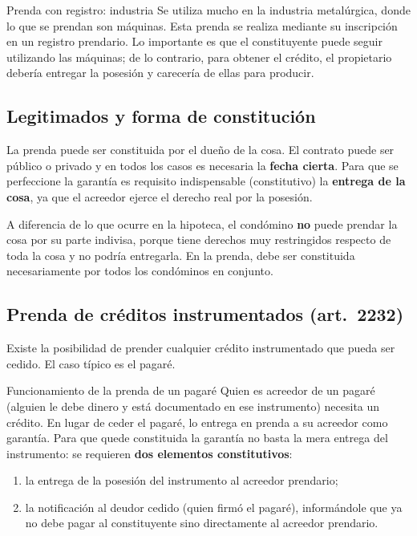 \documentclass[12pt,oneside]{book}
\begin{document}
\begin{example}{Prenda con registro: industria}
Se utiliza mucho en la industria metalúrgica, donde lo que se prendan son máquinas. Esta prenda se realiza mediante su inscripción en un registro prendario. Lo importante es que el constituyente puede seguir utilizando las máquinas; de lo contrario, para obtener el crédito, el propietario debería entregar la posesión y carecería de ellas para producir.
\end{example}

\subsection{Legitimados y forma de constitución}

La prenda puede ser constituida por el dueño de la cosa. El contrato puede ser público o privado y en todos los casos es necesaria la \textbf{fecha cierta}. Para que se perfeccione la garantía es requisito indispensable (constitutivo) la \textbf{entrega de la cosa}, ya que el acreedor ejerce el derecho real por la posesión.

\begin{note}
A diferencia de lo que ocurre en la hipoteca, el condómino \textbf{no} puede prendar la cosa por su parte indivisa, porque tiene derechos muy restringidos respecto de toda la cosa y no podría entregarla. En la prenda, debe ser constituida necesariamente por todos los condóminos en conjunto.
\end{note}

\subsection{Prenda de créditos instrumentados (art.~2232)}

Existe la posibilidad de prender cualquier crédito instrumentado que pueda ser cedido. El caso típico es el pagaré.

\begin{example}{Funcionamiento de la prenda de un pagaré}
Quien es acreedor de un pagaré (alguien le debe dinero y está documentado en ese instrumento) necesita un crédito. En lugar de ceder el pagaré, lo entrega en prenda a su acreedor como garantía. Para que quede constituida la garantía no basta la mera entrega del instrumento: se requieren \textbf{dos elementos constitutivos}:
\begin{enumerate}
    \item la entrega de la posesión del instrumento al acreedor prendario;
    \item la notificación al deudor cedido (quien firmó el pagaré), informándole que ya no debe pagar al constituyente sino directamente al acreedor prendario.
\end{enumerate}
\end{example}
\end{document}
